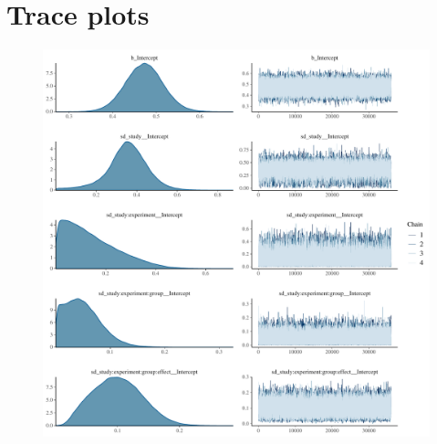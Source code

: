 \documentclass[
]{report}
\begin{document}
\hypertarget{trace-plots}{%
\section{Trace plots}\label{trace-plots}}

\begin{figure}

{\centering \includegraphics[width=1\textwidth,height=\textheight]{diagnostic_plots_files/figure-pdf/unnamed-chunk-2-1.pdf}

}

\end{figure}
\end{document}
